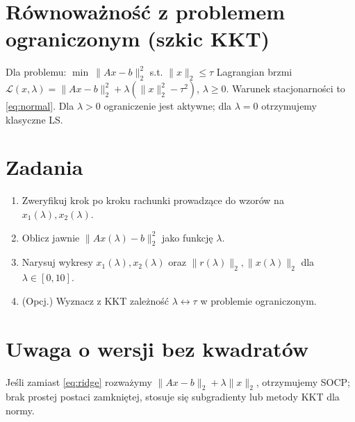 \documentclass[12pt]{article}
\begin{document}
\section*{Równoważność z problemem ograniczonym (szkic KKT)}
Dla problemu: \(\min\ \|Ax-b\|_2^2\) s.t. \(\|x\|_2\le \tau\) Lagrangian brzmi
\(\mathcal{L}(x,\lambda)=\|Ax-b\|_2^2+\lambda(\|x\|_2^2-\tau^2)\), \(\lambda\ge0\). Warunek stacjonarności to \eqref{eq:normal}. Dla \(\lambda>0\) ograniczenie jest aktywne; dla \(\lambda=0\) otrzymujemy klasyczne LS.

\section*{Zadania}
\begin{enumerate}
  \item Zweryfikuj krok po kroku rachunki prowadzące do wzorów na \(x_1(\lambda),x_2(\lambda)\).
  \item Oblicz jawnie \(\|Ax(\lambda)-b\|_2^2\) jako funkcję \(\lambda\).
  \item Narysuj wykresy \(x_1(\lambda),x_2(\lambda)\) oraz \(\|r(\lambda)\|_2,\|x(\lambda)\|_2\) dla \(\lambda\in[0,10]\).
  \item (Opcj.) Wyznacz z KKT zależność \(\lambda\leftrightarrow \tau\) w problemie ograniczonym.
\end{enumerate}

\section*{Uwaga o wersji bez kwadratów}
Jeśli zamiast \eqref{eq:ridge} rozważymy \(\|Ax-b\|_2+\lambda\|x\|_2\), otrzymujemy SOCP; brak prostej postaci zamkniętej, stosuje się subgradienty lub metody KKT dla normy.
\end{document}
